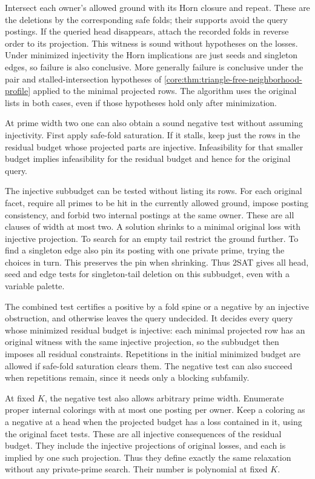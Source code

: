 Intersect each owner's allowed ground with its
Horn closure and repeat. These are the deletions
by the corresponding safe folds; their supports
avoid the query postings. If the queried head
disappears, attach the recorded folds in reverse
order to its projection. This witness is sound
without hypotheses on the losses. Under minimized
injectivity the Horn implications are just seeds
and singleton edges, so failure is also conclusive.
More generally failure is conclusive under the
pair and stalled-intersection hypotheses of
\cref{core:thm:triangle-free-neighborhood-profile}
applied to the minimal projected rows. The
algorithm uses the original lists in both cases,
even if those hypotheses hold only after
minimization.

At prime width two one can also obtain a sound
negative test without assuming injectivity.
First apply safe-fold saturation. If it stalls,
keep just the rows in the residual budget whose
projected parts are injective. Infeasibility
for that smaller budget implies infeasibility
for the residual budget and hence for the
original query.

The injective subbudget can be tested without
listing its rows. For each original facet,
require all primes to be hit in the currently
allowed ground, impose posting consistency,
and forbid two internal postings at the same
owner. These are all clauses of width at most
two. A solution shrinks to a minimal original
loss with injective projection. To search for
an empty tail restrict the ground further.
To find a singleton edge also pin its posting
with one private prime, trying the choices in
turn. This preserves the pin when shrinking.
Thus $2$SAT gives all head, seed and edge
tests for singleton-tail deletion on this
subbudget, even with a variable palette.

The combined test certifies a positive by a
fold spine or a negative by an injective
obstruction, and otherwise leaves the query
undecided. It decides every query whose
minimized residual budget is injective:
each minimal projected row has an original
witness with the same injective projection,
so the subbudget then imposes all residual
constraints. Repetitions in the initial
minimized budget are allowed if safe-fold
saturation clears them. The negative test
can also succeed when repetitions remain,
since it needs only a blocking subfamily.

At fixed $K$, the negative test also allows arbitrary
prime width. Enumerate proper internal colorings
with at most one posting per owner. Keep a coloring
as a negative at a head when the projected budget
has a loss contained in it, using the original
facet tests. These are all injective consequences
of the residual budget. They include the injective
projections of original losses, and each is implied
by one such projection. Thus they define exactly
the same relaxation without any private-prime
search. Their number is polynomial at fixed $K$.

